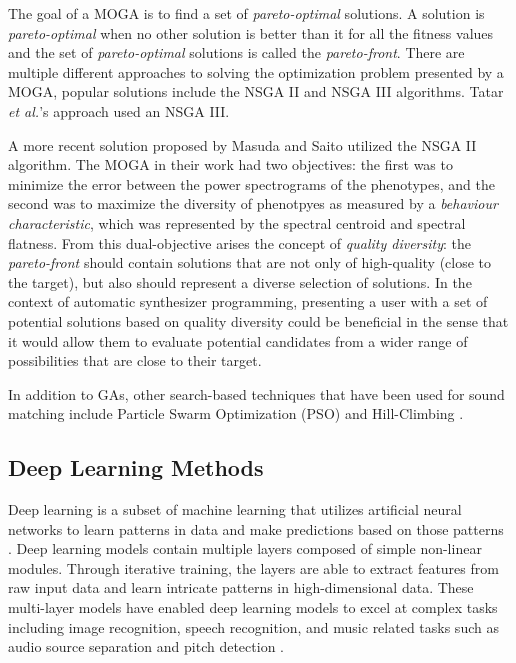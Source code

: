The goal of a MOGA is to find a set of \textit{pareto-optimal} solutions. A solution is \textit{pareto-optimal} when no other solution is better than it for all the fitness values and the set of \textit{pareto-optimal} solutions is called the \textit{pareto-front}. There are multiple different approaches to solving the optimization problem presented by a MOGA, popular solutions include the NSGA II \cite{deb2002fast} and NSGA III \cite{deb2013evolutionary} algorithms. Tatar \textit{et al.}'s approach used an NSGA III. 

A more recent solution proposed by Masuda and Saito \cite{masudo2021quality} utilized the NSGA II algorithm. The MOGA in their work had two objectives: the first was to minimize the error between the power spectrograms of the phenotypes, and the second was to maximize the diversity of phenotpyes as measured by a \textit{behaviour characteristic}, which was represented by the spectral centroid and spectral flatness. From this dual-objective arises the concept of \textit{quality diversity}: the \textit{pareto-front} should contain solutions that are not only of high-quality (close to the target), but also should represent a diverse selection of solutions. In the context of automatic synthesizer programming, presenting a user with a set of potential solutions based on quality diversity could be beneficial in the sense that it would allow them to evaluate potential candidates from a wider range of possibilities that are close to their target.


In addition to GAs, other search-based techniques that have been used for sound matching include Particle Swarm Optimization (PSO) \cite{heise2009automatic} and Hill-Climbing \cite{roth2011comparison, luke2019stochastic}.

\subsection{Deep Learning Methods}
Deep learning is a subset of machine learning that utilizes artificial neural networks to learn patterns in data and make predictions based on those patterns \cite{lecun2015deep}. Deep learning models contain multiple layers composed of simple non-linear modules. Through iterative training, the layers are able to extract features from raw input data and learn intricate patterns in high-dimensional data. These multi-layer models have enabled deep learning models to excel at complex tasks including image recognition, speech recognition, and music related tasks such as audio source separation \cite{spleeter2019} and pitch detection \cite{kim2018crepe}.

